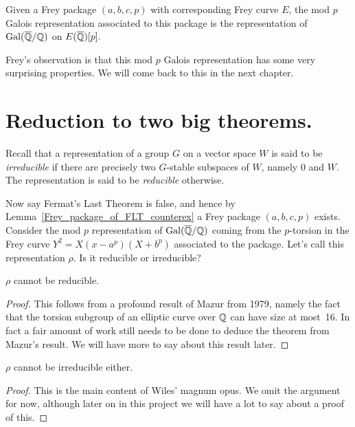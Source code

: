 \begin{definition}\label{Frey_mod_p_Galois_representation} Given a Frey package $(a,b,c,p)$ with corresponding Frey curve $E$, the mod $p$ Galois representation associated to this package is the representation of $\operatorname{Gal}(\overline{\mathbb{Q}}/\mathbb{Q})$ on $E(\overline{\mathbb{Q}})[p].$\end{definition}

Frey's observation is that this mod $p$ Galois representation has some very surprising properties. We will come back to this in the next chapter.

\section{Reduction to two big theorems.}
  
Recall that a representation of a group $G$ on a vector space $W$ is said to be \emph{irreducible} if there are precisely two $G$-stable subspaces of $W$, namely $0$ and $W$. The representation is said to be \emph{reducible} otherwise.

Now say Fermat's Last Theorem is false, and hence by Lemma~\ref{Frey_package_of_FLT_counterex} a Frey package $(a,b,c,p)$ exists.  Consider the mod $p$ representation of $\operatorname{Gal}(\overline{\mathbb{Q}}/\mathbb{Q})$ coming from the $p$-torsion in the Frey curve $Y^2=X(x-a^p)(X+b^p)$ associated to the package. Let's call this representation $\rho$. Is it reducible or irreducible?

\begin{theorem}[Mazur]\label{Mazur_on_Frey_curve}\leanok $\rho$ cannot be reducible.\end{theorem}
\begin{proof}\tangled This follows from a profound result of Mazur \cite{mazur} from 1979, namely the fact that the torsion subgroup of an elliptic curve over $\mathbb{Q}$ can have size at most~16. In fact a fair amount of work still needs to be done to deduce the theorem from Mazur's result. We will have more to say about this result later.
\end{proof}

\begin{theorem}\label{Wiles_on_Frey_curve}\leanok $\rho$ cannot be irreducible either.\end{theorem}
\begin{proof}\tangled This is the main content of Wiles' magnum opus. We omit the argument for now, although later on in this project we will have a lot to say about a proof of this.
\end{proof}

